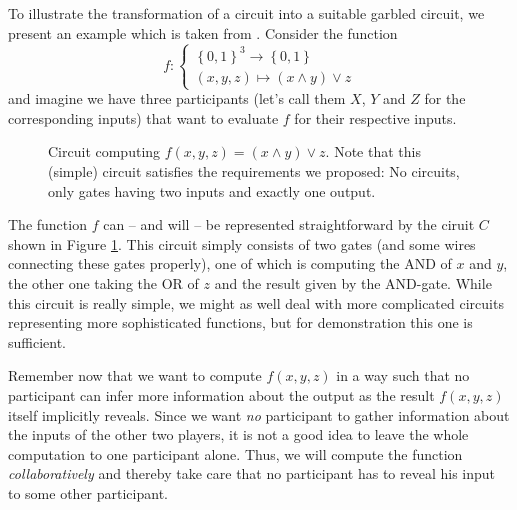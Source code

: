 \message{ !name(seminar.tex)}\documentclass{llncs}
\begin{document}
To illustrate the transformation of a circuit into a suitable garbled circuit, we present an example which is taken from \cite{Rogaway:1991:RCS:888502}. Consider the function 
\begin{equation*}
  f :
  \begin{cases}
    \left\{ 0,1 \right\}^3 \rightarrow \left\{ 0,1 \right\} \\
    (x,y,z) \mapsto (x \wedge y) \vee z
  \end{cases}
\end{equation*}
and imagine we have three participants (let's call them $X$, $Y$ and $Z$ for the corresponding inputs) that want to evaluate $f$ for their respective inputs.

\begin{figure}[t]
  \centering
  \caption{Circuit computing $f(x,y,z)=(x\wedge y)\vee z$. Note that this (simple) circuit satisfies the requirements we proposed: No circuits, only gates having two inputs and exactly one output.}
  \label{fig:simple-circuit}
\end{figure}

The function $f$ can -- and will -- be represented straightforward by the ciruit $C$ shown in Figure \ref{fig:simple-circuit}. This circuit simply consists of two gates (and some wires connecting these gates properly), one of which is computing the AND of $x$ and $y$, the other one taking the OR of $z$ and the result given by the AND-gate. While this circuit is really simple, we might as well deal with more complicated circuits representing more sophisticated functions, but for demonstration this one is sufficient.

Remember now that we want to compute $f(x,y,z)$ in a way such that no participant can infer more information about the output as the result $f(x,y,z)$ itself implicitly reveals. Since we want \emph{no} participant to gather information about the inputs of the other two players, it is not a good idea to leave the whole computation to one participant alone. Thus, we will compute the function \emph{collaboratively} and thereby take care that no participant has to reveal his input to some other participant.
\end{document}
